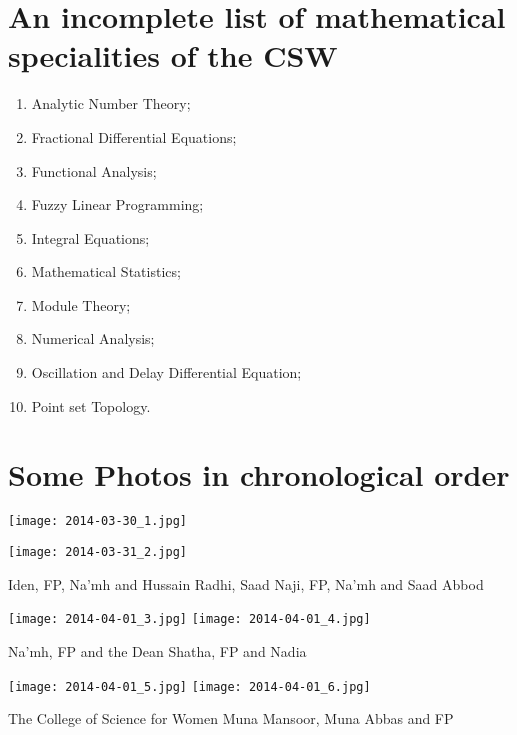 \documentclass[12pt,a4paper]{scrartcl}
\begin{document}
\section{An incomplete list of mathematical specialities of the CSW}

\begin{enumerate}[I]
\item Analytic Number Theory; 
\item Fractional Differential Equations; 
\item Functional Analysis;
\item Fuzzy Linear Programming; 
\item Integral Equations;
\item Mathematical Statistics;
\item Module Theory;
\item Numerical Analysis;   
\item Oscillation and Delay Differential Equation;
\item Point set Topology.
\end{enumerate}
\vfill \newpage

\section{Some Photos in chronological order}



\texttt{[image: 2014-03-30\_1.jpg]}\hspace{2.1cm}\begin{minipage}[t]{9cm}
\texttt{[image: 2014-03-31\_2.jpg]}
                                          \end{minipage}
                                          
\small{\hspace*{.50cm} Iden, FP, Na'mh and Hussain\hspace{3.6cm} Radhi, Saad Naji, FP, Na'mh and Saad Abbod}\bigskip

\texttt{[image: 2014-04-01\_3.jpg]}\hspace{.5cm}
\texttt{[image: 2014-04-01\_4.jpg]}

\small{\hspace{1.9cm} Na'mh, FP and the Dean\hspace{5cm} Shatha, FP and Nadia}\bigskip

\texttt{[image: 2014-04-01\_5.jpg]}\hspace{.5cm}
\texttt{[image: 2014-04-01\_6.jpg]}

\small{\hspace{0.9cm} The College of Science for Women\hspace{3cm}  Muna Mansoor, Muna Abbas and FP}
\end{document}
